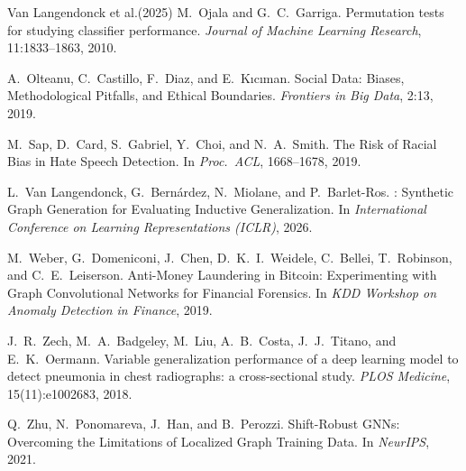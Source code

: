 \documentclass[11pt]{article}
\begin{document}
\begin{thebibliography}{Van Langendonck et al.(2025)}
M.~Ojala and G.~C.~Garriga.
\newblock Permutation tests for studying classifier performance.
\newblock \emph{Journal of Machine Learning Research}, 11:1833--1863, 2010.

A.~Olteanu, C.~Castillo, F.~Diaz, and E.~K{\i}c{\i}man.
\newblock Social Data: Biases, Methodological Pitfalls, and Ethical Boundaries.
\newblock \emph{Frontiers in Big Data}, 2:13, 2019.

M.~Sap, D.~Card, S.~Gabriel, Y.~Choi, and N.~A.~Smith.
\newblock The Risk of Racial Bias in Hate Speech Detection.
\newblock In \emph{Proc.\ ACL}, 1668--1678, 2019.

L.~Van Langendonck, G.~Bern\'ardez, N.~Miolane, and P.~Barlet-Ros.
: Synthetic Graph Generation for Evaluating Inductive
  Generalization.
\newblock In \emph{International Conference on Learning Representations (ICLR)},
  2026.

M.~Weber, G.~Domeniconi, J.~Chen, D.~K.~I.~Weidele, C.~Bellei, T.~Robinson, and
  C.~E.~Leiserson.
\newblock Anti-Money Laundering in Bitcoin: Experimenting with Graph
  Convolutional Networks for Financial Forensics.
\newblock In \emph{KDD Workshop on Anomaly Detection in Finance}, 2019.

J.~R.~Zech, M.~A.~Badgeley, M.~Liu, A.~B.~Costa, J.~J.~Titano, and E.~K.~Oermann.
\newblock Variable generalization performance of a deep learning model to detect
  pneumonia in chest radiographs: a cross-sectional study.
\newblock \emph{PLOS Medicine}, 15(11):e1002683, 2018.

Q.~Zhu, N.~Ponomareva, J.~Han, and B.~Perozzi.
\newblock Shift-Robust {GNN}s: Overcoming the Limitations of Localized Graph
  Training Data.
\newblock In \emph{NeurIPS}, 2021.

\end{thebibliography}
\end{document}
